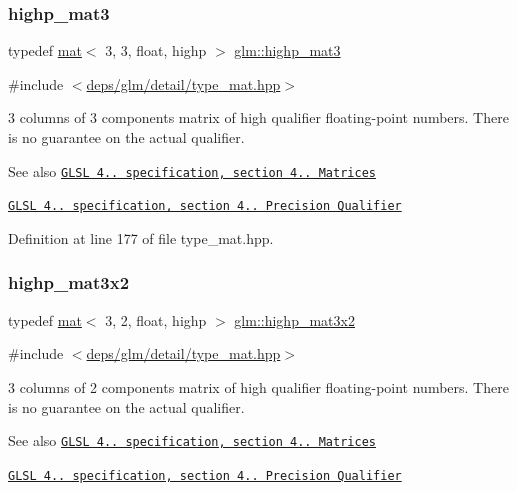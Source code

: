 \subsubsection{\texorpdfstring{highp\+\_\+mat3}{highp\_mat3}}
{\footnotesize\ttfamily typedef \hyperlink{structglm_1_1mat}{mat}$<$ 3, 3, float, highp $>$ \hyperlink{group__core__precision_gaa1178bd043ab93d1207bda8d06cd078c}{glm\+::highp\+\_\+mat3}}



{\ttfamily \#include $<$\hyperlink{type__mat_8hpp}{deps/glm/detail/type\+\_\+mat.\+hpp}$>$}

3 columns of 3 components matrix of high qualifier floating-\/point numbers. There is no guarantee on the actual qualifier.

\begin{DoxySeeAlso}{See also}
\href{http://www.opengl.org/registry/doc/GLSLangSpec.4.20.8.pdf}{\tt G\+L\+SL 4.. specification, section 4.. Matrices} 

\href{http://www.opengl.org/registry/doc/GLSLangSpec.4.20.8.pdf}{\tt G\+L\+SL 4.. specification, section 4.. Precision Qualifier} 
\end{DoxySeeAlso}


Definition at line 177 of file type\+\_\+mat.\+hpp.

\mbox{\label{group__core__precision_ga2188c0b772ac9d6210d46af34e04f375}} 
\subsubsection{\texorpdfstring{highp\+\_\+mat3x2}{highp\_mat3x2}}
{\footnotesize\ttfamily typedef \hyperlink{structglm_1_1mat}{mat}$<$ 3, 2, float, highp $>$ \hyperlink{group__core__precision_ga2188c0b772ac9d6210d46af34e04f375}{glm\+::highp\+\_\+mat3x2}}



{\ttfamily \#include $<$\hyperlink{type__mat_8hpp}{deps/glm/detail/type\+\_\+mat.\+hpp}$>$}

3 columns of 2 components matrix of high qualifier floating-\/point numbers. There is no guarantee on the actual qualifier.

\begin{DoxySeeAlso}{See also}
\href{http://www.opengl.org/registry/doc/GLSLangSpec.4.20.8.pdf}{\tt G\+L\+SL 4.. specification, section 4.. Matrices} 

\href{http://www.opengl.org/registry/doc/GLSLangSpec.4.20.8.pdf}{\tt G\+L\+SL 4.. specification, section 4.. Precision Qualifier} 
\end{DoxySeeAlso}


